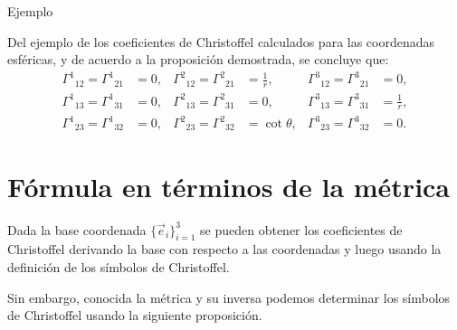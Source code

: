 \documentclass[../apunte_mecanica_clasica.tex]{subfiles}%
\begin{document}
\begin{apuntebloque}{Ejemplo}

Del ejemplo de los coeficientes de Christoffel calculados para las 
coordenadas esféricas, y de acuerdo a la proposición demostrada, se concluye que:
\begin{align*}
    \Gamma^1{}_{12} = \Gamma^1{}_{21} &= 0, &
    \Gamma^2{}_{12} = \Gamma^2{}_{21} &= \tfrac{1}{r}, &
    \Gamma^3{}_{12} = \Gamma^3{}_{21} &= 0, \\[6pt]
    \Gamma^1{}_{13} = \Gamma^1{}_{31} &= 0, &
    \Gamma^2{}_{13} = \Gamma^2{}_{31} &= 0, &
    \Gamma^3{}_{13} = \Gamma^3{}_{31} &= \tfrac{1}{r}, \\[6pt]
    \Gamma^1{}_{23} = \Gamma^1{}_{32} &= 0, &
    \Gamma^2{}_{23} = \Gamma^2{}_{32} &= \cot\theta, &
    \Gamma^3{}_{23} = \Gamma^3{}_{32} &= 0.
\end{align*}


\end{apuntebloque}


\section{Fórmula en términos de la métrica}

Dada la base coordenada $\{\vec{e}_i\}_{i=1}^3$ se pueden obtener los 
coeficientes de Christoffel derivando la base con respecto a las 
coordenadas y luego usando la definición de los símbolos de Christoffel.  

Sin embargo, conocida la métrica y su inversa podemos determinar 
los símbolos de Christoffel usando la siguiente proposición.
\end{document}
